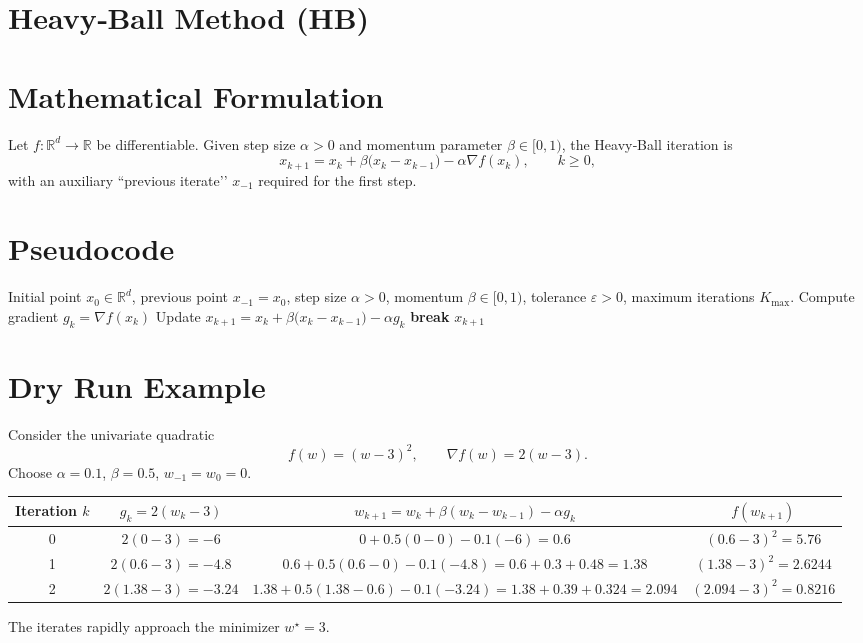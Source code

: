 \documentclass[11pt]{article}
\begin{document}
\section*{Heavy‑Ball Method (HB)}

\section*{Mathematical Formulation}
Let $f:\mathbb{R}^d\rightarrow\mathbb{R}$ be differentiable.  
Given step size $\alpha>0$ and momentum parameter $\beta\in[0,1)$, the Heavy‑Ball iteration is
\[
\boxed{\;
x_{k+1}=x_k+\beta\bigl(x_k-x_{k-1}\bigr)-\alpha\nabla f(x_k),\qquad k\ge 0,
\;}
\tag{HB}
\]
with an auxiliary ``previous iterate’’ $x_{-1}$ required for the first step.  

\section*{Pseudocode}
\begin{algorithm}[H]
\caption{Heavy‑Ball Method}
\begin{algorithmic}[1]
\REQUIRE Initial point $x_0\in\mathbb{R}^d$, previous point $x_{-1}=x_0$, step size $\alpha>0$, momentum $\beta\in[0,1)$, tolerance $\varepsilon>0$, maximum iterations $K_{\max}$.
    \STATE Compute gradient $g_k=\nabla f(x_k)$
    \STATE Update $x_{k+1}=x_k+\beta\bigl(x_k-x_{k-1}\bigr)-\alpha g_k$
        \STATE \textbf{break}
    \ENDIF
\ENDFOR
\RETURN $x_{k+1}$
\end{algorithmic}
\end{algorithm}

\section*{Dry Run Example}
Consider the univariate quadratic
\[
f(w)=(w-3)^2,\qquad \nabla f(w)=2(w-3).
\]
Choose $\alpha=0.1$, $\beta=0.5$, $w_{-1}=w_0=0$.

\begin{center}
\begin{tabular}{c|c|c|c}
Iteration $k$ & $g_k=2(w_k-3)$ & $w_{k+1}=w_k+\beta(w_k-w_{k-1})-\alpha g_k$ & $f(w_{k+1})$\\ \hline
0 & $2(0-3)=-6$ & $0+0.5(0-0)-0.1(-6)=0.6$ & $(0.6-3)^2=5.76$\\
1 & $2(0.6-3)=-4.8$ & $0.6+0.5(0.6-0)-0.1(-4.8)=0.6+0.3+0.48=1.38$ & $(1.38-3)^2=2.6244$\\
2 & $2(1.38-3)=-3.24$ & $1.38+0.5(1.38-0.6)-0.1(-3.24)=1.38+0.39+0.324=2.094$ & $(2.094-3)^2=0.8216$\\
\end{tabular}
\end{center}
The iterates rapidly approach the minimizer $w^\star=3$.
\end{document}
